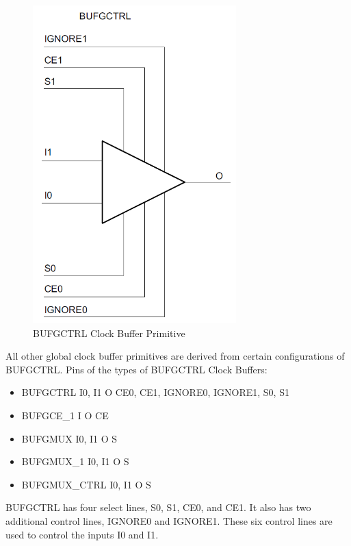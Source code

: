 \documentclass[12pt, a4paper]{report}
\begin{document}
    \begin{figure}[H]
        \begin{center}
            \includegraphics[width=0.7\textwidth]{images/BUFGCTRL.png}
            \caption{BUFGCTRL Clock Buffer Primitive}
            \label{BUFGCTRL}
        \end{center}
    \end{figure}
    
    All other global clock buffer primitives are derived from certain configurations of BUFGCTRL. Pins of the types of BUFGCTRL Clock Buffers:
    \begin{itemize}
        \item BUFGCTRL I0, I1 O CE0, CE1, IGNORE0, IGNORE1, S0, S1
        \item BUFGCE\_1 I O CE
        \item BUFGMUX I0, I1 O S
        \item BUFGMUX\_1 I0, I1 O S
        \item BUFGMUX\_CTRL I0, I1 O S
    \end{itemize}

    BUFGCTRL has four select lines, S0, S1, CE0, and CE1. It also has two additional control lines, IGNORE0 and IGNORE1. These six control lines are used to control the inputs I0 and I1.
\end{document}
